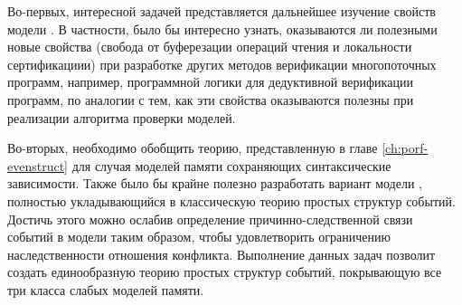 Во-первых, интересной задачей представляется
дальнейшее изучение свойств модели \WkmS.
В частности, было бы интересно узнать,
оказываются ли полезными новые свойства \WkmS
(свобода от буферезации операций чтения и локальности сертификациии)
при разработке других методов верификации многопоточных программ,
например, программной логики для дедуктивной верификации программ,
по аналогии с тем, как эти свойства оказываются полезны
при реализации алгоритма проверки моделей. 

Во-вторых, необходимо обобщить теорию, представленную в главе \ref{ch:porf-evenstruct}
для случая моделей памяти сохраняющих синтаксические зависимости.
Также было бы крайне полезно разработать вариант модели \Wkm,
полностью укладывающийся в классическую теорию простых структур событий. 
Достичь этого можно ослабив определение причинно-следственной связи
событий в модели \Wkm таким образом, чтобы удовлетворить
ограничению наследственности отношения конфликта.
Выполнение данных задач позволит создать единообразную
теорию простых структур событий, покрывающую
все три класса слабых моделей памяти.



